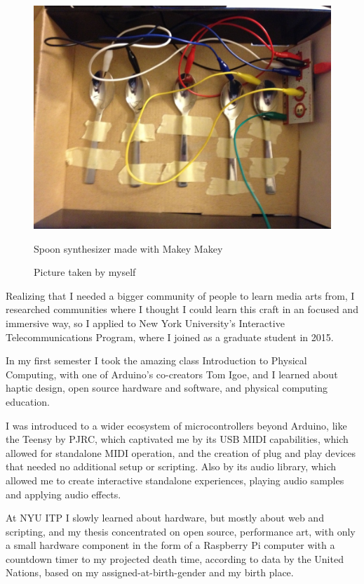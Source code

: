 \begin{figure}[ht]
  \centering
  \includegraphics[width=0.75\linewidth,height=0.25\textheight,keepaspectratio]{images/makey-makey-spoons.jpg}
  \caption{Spoon synthesizer made with Makey Makey}
  \caption*{Picture taken by myself}
  \label{fig:makey-makey-spoons}
\end{figure}

Realizing that I needed a bigger community of people to learn media arts from, I researched communities where I thought I could learn this craft in an focused and immersive way, so I applied to New York University's Interactive Telecommunications Program, where I joined as a graduate student in 2015.

In my first semester I took the amazing class Introduction to Physical Computing, with one of Arduino's co-creators Tom Igoe, and I learned about haptic design, open source hardware and software, and physical computing education.

I was introduced to a wider ecosystem of microcontrollers beyond Arduino, like the Teensy by PJRC, which captivated me by its USB MIDI capabilities, which allowed for standalone MIDI operation, and the creation of plug and play devices that needed no additional setup or scripting. Also by its audio library, which allowed me to create interactive standalone experiences, playing audio samples and applying audio effects.

At NYU ITP I slowly learned about hardware,  but mostly about web and scripting, and my thesis concentrated on open source, performance art, with only a small hardware component in the form of a Raspberry Pi computer with a countdown timer to my projected death time, according to data by the United Nations, based on my assigned-at-birth-gender and my birth place.

